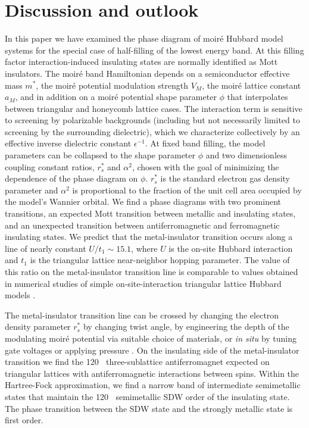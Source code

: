 \documentclass[%
 reprint,
 superscriptaddress,
 amsmath,amssymb,
 aps,
 prx,
 floatfix,
]{revtex4-2}
\newcommand{\<}{\langle}
\renewcommand{\>}{\rangle}
\renewcommand{\(}{\left(}
\renewcommand{\)}{\right)}
\renewcommand{\[}{\left[}
\renewcommand{\]}{\right]}
\DeclareMathOperator{\degree}{^{\circ}}
\begin{document}
\section{\label{sec:outlook}Discussion and outlook}

In this paper we have examined the phase diagram of moir\'e Hubbard model systems for the special case of half-filling
of the lowest energy band.  At this filling factor interaction-induced insulating states are normally identified as Mott insulators.
The moir\'e band Hamiltonian \cite{fengchengHubbard} depends on a semiconductor effective mass $m^*$,
the moir\'e potential modulation strength $V_M$, the moir\'e lattice constant $a_M$, 
and in addition on a moir\'e potential shape parameter $\phi$ that interpolates between triangular and honeycomb lattice cases.  The interaction term
is sensitive to screening by polarizable backgrounds (including but not necessarily limited to \cite{liu2021tuning} 
screening by the surrounding dielectric), which we 
characterize collectively by an effective inverse dielectric constant $\epsilon^{-1}$.
At fixed band filling, the model parameters can be collapsed to the shape parameter $\phi$ and 
two dimensionless coupling constant ratios, $r_s^*$ and $\alpha^2$,
chosen with the goal of minimizing the dependence of the phase diagram on $\phi$.  
$r_s^*$ is the standard
electron gas density parameter and $\alpha^2$ is proportional to the fraction of the unit cell area 
occupied by the model's Wannier orbital.  
We find a phase diagrams with two prominent transitions, an expected Mott transition between metallic and 
insulating states, and an unexpected transition between antiferromagnetic and ferromagnetic insulating states.
We predict that the metal-insulator transition occurs along a line of nearly constant $U/t_1\sim 15.1$, where $U$ is the 
on-site Hubbard interaction and $t_1$ is the triangular lattice near-neighbor hopping parameter.  The value of this ratio 
on the metal-insulator transition line is comparable to values obtained in numerical studies of simple on-site-interaction 
triangular lattice Hubbard models \cite{PhysRevX.10.021042,becca2020Utratio}. 

The metal-insulator transition line can be crossed by changing the electron density parameter $r_s^*$ by 
changing twist angle, by engineering the depth of the modulating moir\'e potential via suitable choice of materials,
or {\em in situ} by tuning gate voltages \cite{mak2021continuousMIT,dean2021quantumcritical} or applying pressure \cite{Yankowitz1059}.
On the insulating side of the metal-insulator transition we find the 120$\degree$ three-sublattice antiferromagnet expected on triangular lattices
with antiferromagnetic interactions between spins.  Within the Hartree-Fock approximation, we find a narrow band of intermediate semimetallic 
states that maintain the 120$\degree$ semimetallic SDW order of the insulating state.  The phase transition between the SDW state 
and the strongly metallic state is first order.
\end{document}
